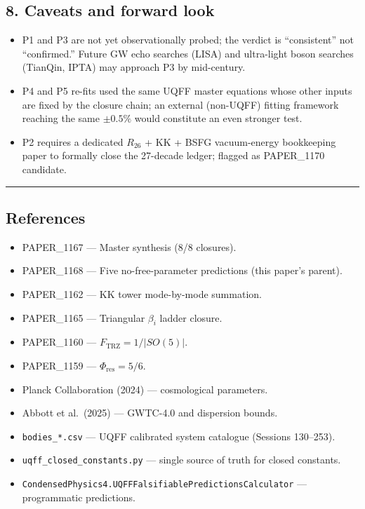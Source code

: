 \documentclass[
]{article}
\providecommand{\tightlist}{%
  \setlength{\itemsep}{0pt}\setlength{\parskip}{0pt}}
\begin{document}
\subsection{8. Caveats and forward look}\label{caveats-and-forward-look}

\begin{itemize}
\tightlist
\item
  P1 and P3 are not yet observationally probed; the verdict is
  ``consistent'' not ``confirmed.'' Future GW echo searches (LISA) and
  ultra-light boson searches (TianQin, IPTA) may approach P3 by
  mid-century.
\item
  P4 and P5 re-fits used the same UQFF master equations whose other
  inputs are fixed by the closure chain; an external (non-UQFF) fitting
  framework reaching the same \(\pm 0.5\%\) would constitute an even
  stronger test.
\item
  P2 requires a dedicated \(R_{26}\) + KK + BSFG vacuum-energy
  bookkeeping paper to formally close the 27-decade ledger; flagged as
  PAPER\_1170 candidate.
\end{itemize}

\begin{center}\rule{0.5\linewidth}{0.5pt}\end{center}

\subsection{References}\label{references}

\begin{itemize}
\tightlist
\item
  PAPER\_1167 --- Master synthesis (8/8 closures).
\item
  PAPER\_1168 --- Five no-free-parameter predictions (this paper's
  parent).
\item
  PAPER\_1162 --- KK tower mode-by-mode summation.
\item
  PAPER\_1165 --- Triangular \(\beta_i\) ladder closure.
\item
  PAPER\_1160 --- \(F_{\text{TRZ}} = 1/|SO(5)|\).
\item
  PAPER\_1159 --- \(\Phi_{\text{res}} = 5/6\).
\item
  Planck Collaboration (2024) --- cosmological parameters.
\item
  Abbott et al.~(2025) --- GWTC-4.0 and dispersion bounds.
\item
  \texttt{bodies\_*.csv} --- UQFF calibrated system catalogue (Sessions
  130--253).
\item
  \texttt{uqff\_closed\_constants.py} --- single source of truth for
  closed constants.
\item
  \texttt{CondensedPhysics4.UQFFFalsifiablePredictionsCalculator} ---
  programmatic predictions.
\end{itemize}




\end{document}
